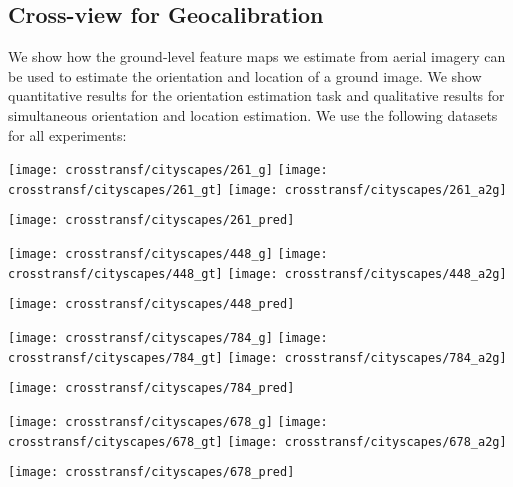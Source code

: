 \subsection{Cross-view for Geocalibration}


We show how the ground-level feature maps we estimate from aerial
imagery can be used to estimate the orientation and location of a
ground image.  We show quantitative results for the orientation
estimation task and qualitative results for simultaneous orientation
and location estimation. We use the following datasets for all
experiments:




\begin{figure*}
  \setlength{\aheight}{63pt}
  \setlength{\gwidth}{52.44pt}
  \centering

  \begin{minipage}[b]{\gwidth}
  \texttt{[image: crosstransf/cityscapes/261\_g]}
  \texttt{[image: crosstransf/cityscapes/261\_gt]}
  \texttt{[image: crosstransf/cityscapes/261\_a2g]}
  \end{minipage}
  \texttt{[image: crosstransf/cityscapes/261\_pred]}
  \hfill
  \begin{minipage}[b]{\gwidth}
  \texttt{[image: crosstransf/cityscapes/448\_g]}
  \texttt{[image: crosstransf/cityscapes/448\_gt]}
  \texttt{[image: crosstransf/cityscapes/448\_a2g]}
  \end{minipage}
  \texttt{[image: crosstransf/cityscapes/448\_pred]}
  \hfill
  \begin{minipage}[b]{\gwidth}
  \texttt{[image: crosstransf/cityscapes/784\_g]}
  \texttt{[image: crosstransf/cityscapes/784\_gt]}
  \texttt{[image: crosstransf/cityscapes/784\_a2g]}
  \end{minipage}
  \texttt{[image: crosstransf/cityscapes/784\_pred]}
  \hfill
  \begin{minipage}[b]{\gwidth}
  \texttt{[image: crosstransf/cityscapes/678\_g]}
  \texttt{[image: crosstransf/cityscapes/678\_gt]}
  \texttt{[image: crosstransf/cityscapes/678\_a2g]}
  \end{minipage}
  \texttt{[image: crosstransf/cityscapes/678\_pred]}


\end{figure*}
